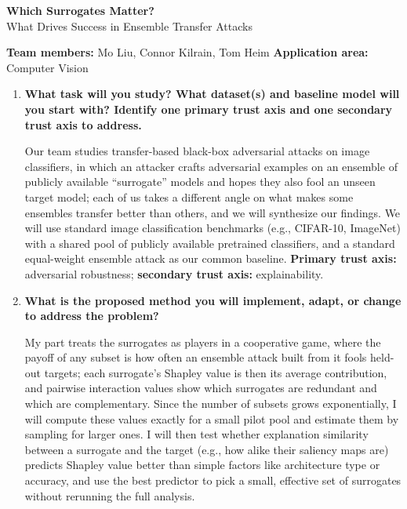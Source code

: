 \documentclass[11pt]{article}
\begin{document}
\begin{center}
{\Large\bfseries Which Surrogates Matter?}\\[4pt]
{\large What Drives Success in Ensemble Transfer Attacks}
\end{center}

\textbf{Team members:} Mo Liu, Connor Kilrain, Tom Heim \hfill \textbf{Application area:} Computer Vision
\vspace{-6pt}

\hrulefill

\begin{enumerate}[leftmargin=*, itemsep=8pt]

\item \textbf{What task will you study? What dataset(s) and baseline model will you start with? Identify one primary trust axis and one secondary trust axis to address.}

Our team studies transfer-based black-box adversarial attacks on image classifiers, in which an attacker crafts adversarial examples on an ensemble of publicly available ``surrogate'' models and hopes they also fool an unseen target model; each of us takes a different angle on what makes some ensembles transfer better than others, and we will synthesize our findings. We will use standard image classification benchmarks (e.g., CIFAR-10, ImageNet) with a shared pool of publicly available pretrained classifiers, and a standard equal-weight ensemble attack as our common baseline. \textbf{Primary trust axis:} adversarial robustness; \textbf{secondary trust axis:} explainability.

\item \textbf{What is the proposed method you will implement, adapt, or change to address the problem?}

My part treats the surrogates as players in a cooperative game, where the payoff of any subset is how often an ensemble attack built from it fools held-out targets; each surrogate's Shapley value is then its average contribution, and pairwise interaction values show which surrogates are redundant and which are complementary. Since the number of subsets grows exponentially, I will compute these values exactly for a small pilot pool and estimate them by sampling for larger ones. I will then test whether explanation similarity between a surrogate and the target (e.g., how alike their saliency maps are) predicts Shapley value better than simple factors like architecture type or accuracy, and use the best predictor to pick a small, effective set of surrogates without rerunning the full analysis.


\end{enumerate}
\end{document}
